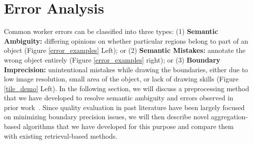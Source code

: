 \section{Error Analysis}
\par Common worker errors can be classified into three types: (1) \textbf{Semantic Ambiguity:} differing opinions on whether particular regions belong to part of an object (Figure \ref{error_examples} Left); or (2) \textbf{Semantic Mistakes:} annotate the wrong object entirely (Figure \ref{error_examples} right); or (3) \textbf{Boundary Imprecision:} unintentional mistakes while drawing the boundaries, either due to low image resolution, small area of the object, or lack of drawing skills (Figure \ref{tile_demo} Left). In the following section, we will discuss a preprocessing method that we have developed to resolve semantic ambiguity and errors observed in prior work~\cite{Sorokin2008,Lin2014,Gurari2018}. Since quality evaluation in past literature have been largely focused on minimizing boundary precision issues, we will then describe novel aggregation-based algorithms that we have developed for this purpose and compare them with existing retrieval-based methods.%
